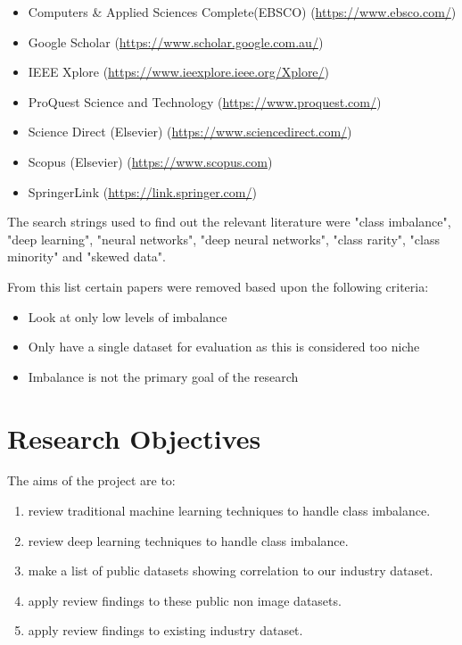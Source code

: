 \begin{itemize}
    \item Computers \& Applied Sciences Complete(EBSCO) (\href{https://www.ebsco.com/}{https://www.ebsco.com/})
    \item Google Scholar (\href{https://www.scholar.google.com.au/}{https://www.scholar.google.com.au/})
	\item IEEE Xplore (\href{https://www.ieexplore.ieee.org/Xplore/}{https://www.ieexplore.ieee.org/Xplore/})
    \item ProQuest Science and Technology (\href{https://www.proquest.com/}{https://www.proquest.com/})
    \item Science Direct (Elsevier) (\href{https://www.sciencedirect.com/}{https://www.sciencedirect.com/})
    \item Scopus (Elsevier) (\href{https://www.scopus.com}{https://www.scopus.com})
    \item SpringerLink (\href{https://link.springer.com/}{https://link.springer.com/})
\end{itemize}

The search strings used to find out the relevant literature were "class imbalance", "deep learning", "neural networks", "deep neural networks", "class rarity", "class minority" and "skewed data". 

From this list certain papers were removed based upon the following criteria:

\begin{itemize}
    \item Look at only low levels of imbalance
    \item Only have a single dataset for evaluation as this is considered too niche
    \item Imbalance is not the primary goal of the research 
\end{itemize}

\section{Research Objectives}\label{sec:RObj} 

The aims of the project are to:
\renewcommand{\theenumi}{\roman{enumi}}
\begin{enumerate}
\item review traditional machine learning techniques to handle class imbalance. 
\item review deep learning techniques to handle class imbalance. 
\item make a list of public datasets showing correlation to our industry dataset. 
\item apply review findings to these public non image datasets. 
\item apply review findings to existing industry dataset. 
\end{enumerate}

